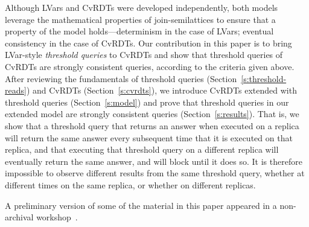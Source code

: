 Although LVars and CvRDTs were developed independently, both models
leverage the mathematical properties of join-semilattices to ensure
that a property of the model holds---determinism in the case of LVars;
eventual consistency in the case of CvRDTs.  
Our contribution in this paper is to bring LVar-style \emph{threshold
queries} to CvRDTs and show that threshold queries of CvRDTs are
strongly consistent queries, according to the criteria given above.
After reviewing the fundamentals of
threshold queries (Section~\ref{s:threshold-reads}) and CvRDTs
(Section~\ref{s:cvrdts}), we introduce CvRDTs extended with threshold
queries (Section~\ref{s:model}) and prove that threshold queries
in our extended model are strongly consistent queries (Section~\ref{s:results}).
That is, we show
that a threshold query that returns an answer when executed on a
replica will return the same answer every subsequent time that it is
executed on that replica, and that executing that threshold query on a
different replica will eventually return the same answer, and will
block until it does so.  
It is therefore impossible to observe
different results from the same threshold query, whether at different
times on the same replica, or whether on different replicas.

A preliminary version of some of the material in this
paper appeared in a non-archival workshop~\cite{wodet-crdts}.



  

